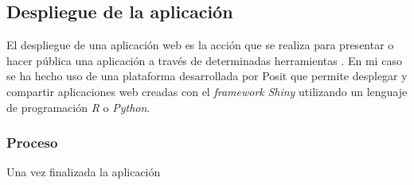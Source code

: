 \subsection{Despliegue de la aplicación}

El despliegue de una aplicación web es la acción que se realiza para presentar o hacer pública una aplicación a través de determinadas herramientas \cite{DespliegueAplicacionesWeb}. En mi caso se ha hecho uso de una plataforma desarrollada por Posit \cite{Shinyappsio} que permite desplegar y compartir aplicaciones web creadas con el \textit{framework} \textit{Shiny} utilizando un lenguaje de programación \textit{R} o \textit{Python}.

\subsubsection{Proceso}
Una vez finalizada la aplicación
